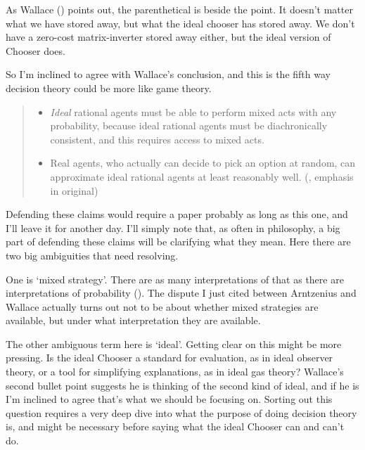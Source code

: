 \documentclass[
  10pt,
  letterpaper,
  DIV=11,
  numbers=noendperiod,
  twoside]{scrartcl}
\providecommand{\tightlist}{%
  \setlength{\itemsep}{0pt}\setlength{\parskip}{0pt}}\usepackage{longtable,booktabs,array}
\begin{document}
As Wallace () points out, the
parenthetical is beside the point. It doesn't matter what we have stored
away, but what the ideal chooser has stored away. We don't have a
zero-cost matrix-inverter stored away either, but the ideal version of
Chooser does.

So I'm inclined to agree with Wallace's conclusion, and this is the
fifth way decision theory could be more like game theory.

\begin{quote}
\begin{itemize}
\tightlist
\item
  \emph{Ideal} rational agents must be able to perform mixed acts with
  any probability, because ideal rational agents must be diachronically
  consistent, and this requires access to mixed acts.\\
\item
  Real agents, who actually can decide to pick an option at random, can
  approximate ideal rational agents at least reasonably well.
  (, emphasis in
  original)
\end{itemize}
\end{quote}

Defending these claims would require a paper probably as long as this
one, and I'll leave it for another day. I'll simply note that, as often
in philosophy, a big part of defending these claims will be clarifying
what they mean. Here there are two big ambiguities that need resolving.

One is `mixed strategy'. There are as many interpretations of that as
there are interpretations of probability
(). The dispute I
just cited between Arntzenius and Wallace actually turns out not to be
about whether mixed strategies are available, but under what
interpretation they are available.

The other ambiguous term here is `ideal'. Getting clear on this might be
more pressing. Is the ideal Chooser a standard for evaluation, as in
ideal observer theory, or a tool for simplifying explanations, as in
ideal gas theory? Wallace's second bullet point suggests he is thinking
of the second kind of ideal, and if he is I'm inclined to agree that's
what we should be focusing on. Sorting out this question requires a very
deep dive into what the purpose of doing decision theory is, and might
be necessary before saying what the ideal Chooser can and can't do.
\end{document}
